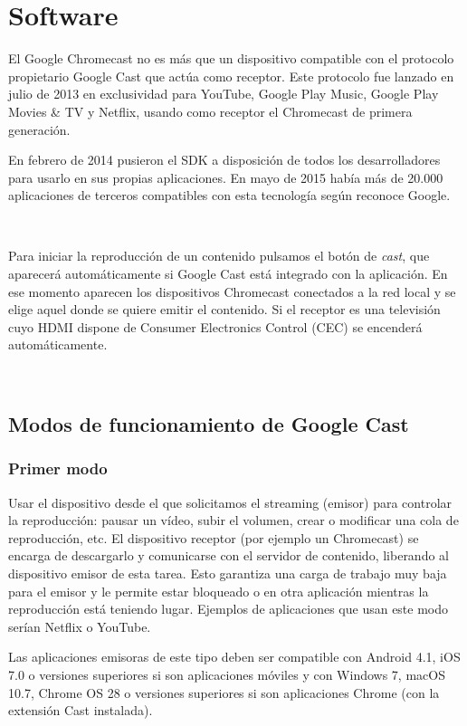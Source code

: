 \section{Software}

El Google Chromecast no es más que un dispositivo compatible con el protocolo propietario Google Cast que actúa como receptor.
Este protocolo fue lanzado en julio de 2013 en exclusividad para YouTube, Google Play Music, Google Play Movies \& TV y Netflix, usando como receptor el Chromecast de primera generación. 

En febrero de 2014 pusieron el SDK a disposición de todos los desarrolladores para usarlo en sus propias aplicaciones.
En mayo de 2015 había más de 20.000 aplicaciones de terceros compatibles con esta tecnología según reconoce Google.

\

Para iniciar la reproducción de un contenido pulsamos el botón de \textit{cast}, que aparecerá automáticamente si Google Cast está integrado con la aplicación.
En ese momento aparecen los dispositivos Chromecast conectados a la red local y se elige aquel donde se quiere emitir el contenido.
Si el receptor es una televisión cuyo HDMI dispone de Consumer Electronics Control (CEC) se encenderá automáticamente.

\

\subsection{Modos de funcionamiento de Google Cast}

\subsubsection{Primer modo}
Usar el dispositivo desde el que solicitamos el streaming (emisor) para controlar la reproducción: pausar un vídeo, subir el volumen, crear o modificar una cola de reproducción, etc.
El dispositivo receptor (por ejemplo un Chromecast) se encarga de descargarlo y comunicarse con el servidor de contenido, liberando al dispositivo emisor de esta tarea.
Esto garantiza una carga de trabajo muy baja para el emisor y le permite estar bloqueado o en otra aplicación mientras la reproducción está teniendo lugar.
Ejemplos de aplicaciones que usan este modo serían Netflix o YouTube.
	
Las aplicaciones emisoras de este tipo deben ser compatible con Android 4.1, iOS 7.0 o versiones superiores si son aplicaciones móviles y con Windows 7, macOS 10.7, Chrome OS 28 o versiones superiores si son aplicaciones Chrome (con la extensión Cast instalada).

